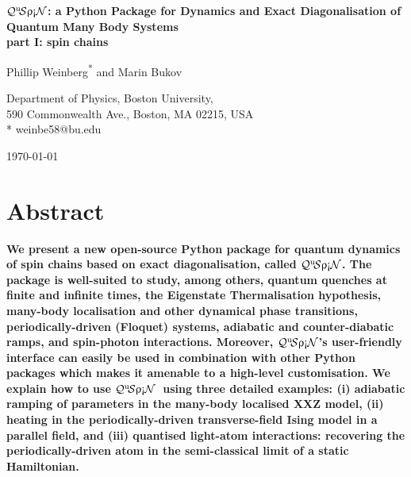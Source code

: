 \documentclass{SciPost}
\newcommand\0{\scalebox{-1}[1]{0}}
\newcommand{\qspin}{$\mathcal{Q}^{\mathrm{u}}\!\mathcal{S}\uprho\mathrm{\text{\textexclamdown}}\mathcal{N}$}
\begin{document}
\begin{center}{\Large \textbf{
\qspin: a Python Package for Dynamics and Exact Diagonalisation of Quantum Many Body Systems\\
\large part I: spin chains
}}\end{center}

\begin{center}
Phillip Weinberg\textsuperscript{*} and Marin Bukov
\end{center}

\begin{center}
Department of Physics, Boston University, \\
590 Commonwealth Ave., Boston, MA 02215, USA
\\
* weinbe58@bu.edu
\end{center}

\begin{center}
\today
\end{center}


\section*{Abstract}
{\bf 
We present a new open-source Python package for quantum dynamics of spin chains based on exact diagonalisation, called \qspin. The package is well-suited to study, among others, quantum quenches at finite and infinite times, the Eigenstate Thermalisation hypothesis, many-body localisation and other dynamical phase transitions, periodically-driven (Floquet) systems, adiabatic and counter-diabatic ramps, and spin-photon interactions. Moreover, \qspin's user-friendly interface can easily be used in combination with other Python packages which makes it amenable to a high-level customisation. We explain how to use \qspin\ using three detailed examples: (i) adiabatic ramping of parameters in the many-body localised XXZ model, (ii) heating in the periodically-driven transverse-field Ising model in a parallel field, and (iii) quantised light-atom interactions: recovering the periodically-driven atom in the semi-classical limit of a static Hamiltonian.
}
\end{document}
